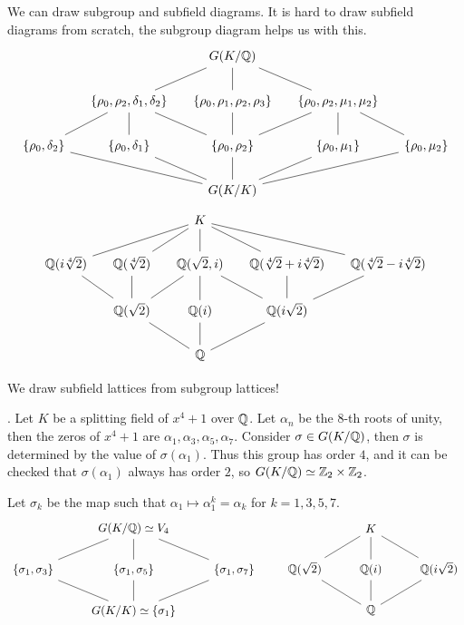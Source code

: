 We can draw subgroup and subfield diagrams. It is hard to draw subfield diagrams from scratch, the subgroup diagram helps us with this.
\[
    \begin{tikzcd}[column sep=small]
        & & G(K/\Q) \arrow[dash]{d} \arrow[dash]{dl} \arrow[dash]{dr} & & \\
        & \{\rho_0, \rho_2, \delta_1, \delta_2\} \arrow[dash]{d} \arrow[dash]{dl} \arrow[dash]{dr} & \{\rho_0, \rho_1, \rho_2, \rho_3\} \arrow[dash]{d} & \{\rho_0, \rho_2, \mu_1, \mu_2\} \arrow[dash]{d} \arrow[dash]{dr} \arrow[dash]{dl} & \\
        \{\rho_0, \delta_2\} & \{\rho_0, \delta_1\} & \{\rho_0, \rho_2\} & \{\rho_0, \mu_1\} & \{\rho_0, \mu_2\} \\
        & & G(K/K) \arrow[dash]{u} \arrow[dash]{ul} \arrow[dash]{ur} \arrow[dash]{ull} \arrow[dash]{urr} & &
    \end{tikzcd}
\]
\[
    \begin{tikzcd}[column sep=small]
        & & K \arrow[dash]{d} \arrow[dash]{dl} \arrow[dash]{dr} \arrow[dash]{dll} \arrow[dash]{drr} & & \\
        \Q(i\sqrt[4]{2}) & \Q(\sqrt[4]{2}) & \Q(\sqrt{2}, i) & \Q(\sqrt[4]{2} + i\sqrt[4]{2}) & \Q(\sqrt[4]{2} - i\sqrt[4]{2}) \\
        & \Q(\sqrt{2}) \arrow[dash]{u} \arrow[dash]{ul} \arrow[dash]{ur} & \Q(i) \arrow[dash]{u} & \Q(i\sqrt{2}) \arrow[dash]{u} \arrow[dash]{ur} \arrow[dash]{ul} & \\
        & & \Q \arrow[dash]{u} \arrow[dash]{ul} \arrow[dash]{ur} & &
    \end{tikzcd}
\]

We draw subfield lattices from subgroup lattices!

\ex. Let \(K\) be a splitting field of \(x^4 + 1\) over \(\mathbb{Q}\). Let \(\alpha_n\) be the \(8\)-th roots of unity, then the zeros of \(x^4 + 1\) are \(\alpha_1, \alpha_3, \alpha_5, \alpha_7\). Consider \(\sigma \in G(K/\mathbb{Q})\), then \(\sigma\) is determined by the value of \(\sigma(\alpha_1)\). Thus this group has order \(4\), and it can be checked that \(\sigma(\alpha_1)\) always has order \(2\), so \(G(K/\mathbb{Q}) \simeq \mathbb{Z}_2 \times \mathbb{Z}_2\).

Let \(\sigma_k\) be the map such that \(\alpha_1 \mapsto \alpha_1^k = \alpha_k\) for \(k = 1, 3, 5, 7\).
\[
    \begin{tikzcd}
        & G(K/\Q) \simeq V_4 \arrow[dash]{d} \arrow[dash]{dl} \arrow[dash]{dr} & \\
        \{\sigma_1, \sigma_3\} & \{\sigma_1, \sigma_5\} & \{\sigma_1, \sigma_7\} \\
        & G(K/K) \simeq \{\sigma_1\} \arrow[dash]{u} \arrow[dash]{ul} \arrow[dash]{ur} & \\
    \end{tikzcd}
    \qquad
    \begin{tikzcd}
        & K \arrow[dash]{d} \arrow[dash]{dl} \arrow[dash]{dr} & \\
        \Q(\sqrt{2}) & \Q(i) & \Q(i\sqrt{2}) \\
        & \Q \arrow[dash]{u} \arrow[dash]{ul} \arrow[dash]{ur}& \\
    \end{tikzcd}
\]

